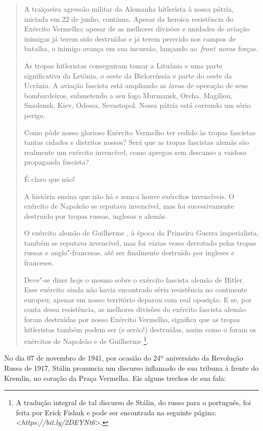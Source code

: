 \begin{quote}
A traiçoeira agressão militar da Alemanha hitlerista à nossa pátria,
iniciada em 22 de junho, continua. Apesar da heroica resistência do
Exército Vermelho; apesar de as melhores divisões e unidades de aviação
inimigas já terem sido destruídas e já terem perecido nos campos de
batalha, o inimigo avança em sua incursão, lançando
ao~\emph{front}~novas forças.

As tropas hitleristas conseguiram tomar a Lituânia e uma parte
significativa da Letônia, o oeste da Bielorrússia e parte do oeste da
Ucrânia. A aviação fascista está ampliando as áreas de operação de seus
bombardeiros, submetendo a seu fogo Murmansk, Orcha, Magiliou, Smolensk,
Kiev, Odessa, Sevastopol. Nossa pátria está correndo um sério perigo.

Como pôde nosso glorioso Exército Vermelho ter cedido às tropas
fascistas tantas cidades e distritos nossos? Será que as tropas
fascistas alemãs são realmente um exército invencível, como apregoa sem
descanso a vaidosa propaganda fascista?

É claro que não!

A história ensina que não há e nunca houve exércitos invencíveis. O
exército de Napoleão se reputava invencível, mas foi sucessivamente
destruído por tropas russas, inglesas e alemãs.

O exército alemão de Guilherme , à época da Primeira Guerra
imperialista, também se reputava invencível, mas foi várias vezes
derrotado pelas tropas russas e anglo"-francesas, até ser finalmente
destruído por ingleses e franceses.

Deve"-se dizer hoje o mesmo sobre o exército fascista alemão de Hitler.
Esse exército ainda não havia encontrado séria resistência no continente
europeu; apenas em nosso território deparou com real oposição. E se, por
conta dessa resistência, as melhores divisões do exército fascista
alemão foram destruídas por nosso Exército Vermelho, significa que as
tropas hitleristas também podem ser (e serão!) destruídas, assim como o
foram os exércitos de Napoleão e de Guilherme \footnote{A tradução
  integral de tal discurso de Stálin, do russo para o português, foi
  feita por Erick Fishuk e pode ser encontrada na seguinte página: \textless{}\emph{https://bit.ly/2DEYNt6}\textgreater{}.}.
\end{quote}

No dia 07 de novembro de 1941, por ocasião do 24º aniversário da
Revolução Russa de 1917, Stálin pronuncia um discurso inflamado de sua
tribuna à frente do Kremlin, no coração da Praça Vermelha. Eis alguns
trechos de sua fala:

